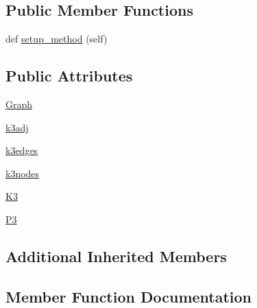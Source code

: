 \subsection*{Public Member Functions}
\begin{DoxyCompactItemize}
\item 
def \hyperlink{classnetworkx_1_1classes_1_1tests_1_1test__special_1_1TestThinDiGraph_a617a437a7a03dc22b3f2680850562301}{setup\+\_\+method} (self)
\end{DoxyCompactItemize}
\subsection*{Public Attributes}
\begin{DoxyCompactItemize}
\item 
\hyperlink{classnetworkx_1_1classes_1_1tests_1_1test__special_1_1TestThinDiGraph_a1fc9e44aec8cc2113ac6f3d17654a8dd}{Graph}
\item 
\hyperlink{classnetworkx_1_1classes_1_1tests_1_1test__special_1_1TestThinDiGraph_af024263b8ad512baa025600672643c56}{k3adj}
\item 
\hyperlink{classnetworkx_1_1classes_1_1tests_1_1test__special_1_1TestThinDiGraph_a85139cbfb471fc445e82a264d7fb5bb1}{k3edges}
\item 
\hyperlink{classnetworkx_1_1classes_1_1tests_1_1test__special_1_1TestThinDiGraph_aa46e662008c1d5be0cb995c6f97d85fa}{k3nodes}
\item 
\hyperlink{classnetworkx_1_1classes_1_1tests_1_1test__special_1_1TestThinDiGraph_a94694246b70d5b2aed2b829c72e3b4b2}{K3}
\item 
\hyperlink{classnetworkx_1_1classes_1_1tests_1_1test__special_1_1TestThinDiGraph_aa4afdb10896ba10eb4ecffe941a304b6}{P3}
\end{DoxyCompactItemize}
\subsection*{Additional Inherited Members}


\subsection{Member Function Documentation}
\mbox{\label{classnetworkx_1_1classes_1_1tests_1_1test__special_1_1TestThinDiGraph_a617a437a7a03dc22b3f2680850562301}} 

